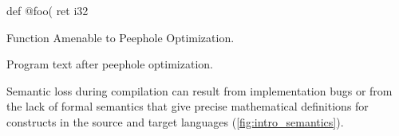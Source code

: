 \documentclass[review, anonymous, acmsmall, screen]{acmart}
\DeclareRobustCommand{\circled}[2][]{%
    \ifthenelse{\isempty{#1}}%
        {\circledbase{pairedOneLightBlue}{#2}}%
        {\autoref{#1}: \hyperref[#1]{\circledbase{pairedOneLightBlue}{#2}}}%
}
\begin{document}
\begin{listing}[H]
def @foo(%
 {
  ret i32 %
 }
\caption{Function Amenable to Peephole Optimization.}
\label{lst:example-peephole-opportunity}
\end{listing}
\begin{listing}[H]
\caption{Program text after peephole optimization.}
\label{lst:example-peephole-optimized}
\end{listing}
Semantic loss during compilation can result from implementation bugs or from the lack of formal 
semantics that give precise mathematical definitions for constructs in the source and target languages
(\autoref{fig:intro_semantics}). 
\end{document}
